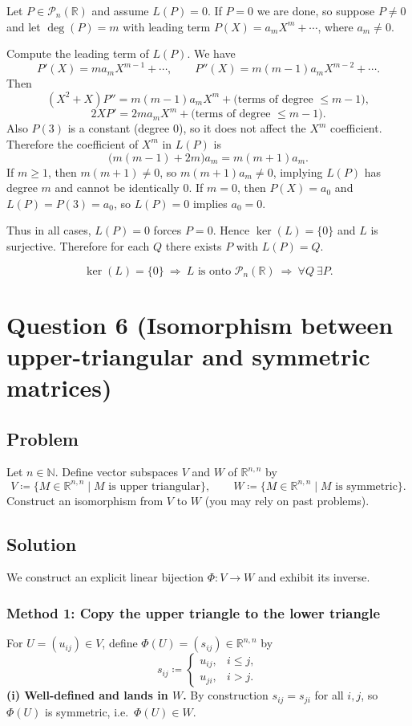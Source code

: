 \documentclass[12pt]{article}
\newcommand{\R}{\mathbb{R}}
\newcommand{\cPn}{\mathcal{P}_n}
\begin{document}
Let $P\in\cPn(\R)$ and assume $L(P)=0$. If $P=0$ we are done, so suppose $P\neq 0$ and let $\deg(P)=m$ with leading term
$P(X)=a_m X^m+\cdots$, where $a_m\neq 0$.

Compute the leading term of $L(P)$.
We have
\[
P'(X)=m a_m X^{m-1}+\cdots,\qquad P''(X)=m(m-1)a_m X^{m-2}+\cdots.
\]
Then
\[
(X^2+X)P'' = m(m-1)a_m X^m+\text{(terms of degree $\le m-1$)},
\]
\[
2X P' = 2m a_m X^m+\text{(terms of degree $\le m-1$)}.
\]
Also $P(3)$ is a constant (degree $0$), so it does not affect the $X^m$ coefficient. Therefore the coefficient of $X^m$ in $L(P)$ is
\[
\bigl(m(m-1)+2m\bigr)a_m = m(m+1)a_m.
\]
If $m\ge 1$, then $m(m+1)\neq 0$, so $m(m+1)a_m\neq 0$, implying $L(P)$ has degree $m$ and cannot be identically $0$.
If $m=0$, then $P(X)=a_0$ and $L(P)=P(3)=a_0$, so $L(P)=0$ implies $a_0=0$.

Thus in all cases, $L(P)=0$ forces $P=0$. Hence $\ker(L)=\{0\}$ and $L$ is surjective. Therefore for each $Q$ there exists $P$ with $L(P)=Q$.

\[
\boxed{\,\ker(L)=\{0\}\ \Rightarrow\ L\text{ is onto }\cPn(\R)\ \Rightarrow\ \forall Q\ \exists P.\,}
\]

\newpage
\section{Question 6 (Isomorphism between upper-triangular and symmetric matrices)}
\subsection{Problem}
Let $n\in\mathbb{N}$. Define vector subspaces $V$ and $W$ of $\R^{n,n}$ by
\[
V\coloneqq \{M\in\R^{n,n}\mid M\text{ is upper triangular}\},\qquad
W\coloneqq \{M\in\R^{n,n}\mid M\text{ is symmetric}\}.
\]
Construct an isomorphism from $V$ to $W$ (you may rely on past problems).

\subsection{Solution}
We construct an explicit linear bijection $\Phi:V\to W$ and exhibit its inverse.

\subsubsection{Method 1: Copy the upper triangle to the lower triangle}
For $U=(u_{ij})\in V$, define $\Phi(U)=(s_{ij})\in\R^{n,n}$ by
\[
s_{ij}\coloneqq
\begin{cases}
u_{ij}, & i\le j,\\
u_{ji}, & i> j.
\end{cases}
\]
\textbf{(i) Well-defined and lands in $W$.}
By construction $s_{ij}=s_{ji}$ for all $i,j$, so $\Phi(U)$ is symmetric, i.e.\ $\Phi(U)\in W$.
\end{document}
